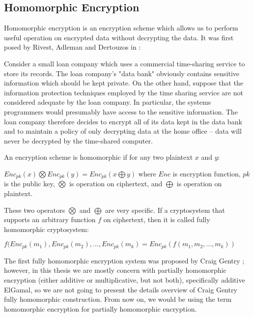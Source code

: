     \subsection{Homomorphic Encryption}
    \label{sec:homomorphic-enc}
	 Homomorphic encryption  is an encryption scheme which allows us to perform useful operation on 
	     encrypted data without decrypting the data.
	     It was first posed by Rivest, Adleman and Dertouzos in \citep{rivest1978data}: 
      
       \begin{displayquote}  
	     Consider a small loan company which uses a commercial time-sharing service to store its records.  
	     The loan company’s "data bank" obviously contains sensitive information which should be kept private.  
	     On the other hand, suppose that the information protection techniques employed by the time sharing 
	     service are not considered adequate by the loan company.  In particular, the systems programmers would 
	     presumably have access to the sensitive information.  The loan company therefore decides to encrypt all 
	     of its data kept in the data bank and to maintain a policy of only decrypting data at the home office -- data 
	     will never be decrypted by the time-shared computer.
	   \end{displayquote}  

 \noindent	     
 An encryption scheme is homomorphic if for any two plaintext $x$ and $y$:
		\begin{displayquote}
		
		 $Enc_{pk}(x) \bigotimes Enc_{pk}(y) = Enc_{pk} (x \bigoplus y)$  where 
		$Enc$ is encryption function, $pk$ is the public key, $\bigotimes$ is operation on ciphertext, and $\bigoplus$
		 is operation on plaintext.
		
		\end{displayquote}
				
		These two operators $\bigotimes$ and $\bigoplus$ are very specific. If a cryptosystem that supports an arbitrary 
		function $f$ on ciphertext, then it is called fully homomorphic cryptosystem:
		\begin{displayquote}
		  $ f (Enc_{pk}(m_{1}), Enc_{pk}(m_{2}), ..., Enc_{pk}(m_{k}) = Enc_{pk}( f (m_{1}, m_{2}, ..., m_{k}))$ 
	    \end{displayquote}
		
		\noindent
		The first fully homomorphic encryption system was proposed by Craig Gentry \citep{Gentry:2009:FHE:1834954}; however, 
		in this thesis we are mostly concern with partially homomorphic encryption (either additive or multiplicative, but not both),
		specifically additive ElGamal, 
		so we are not going to present the details overview 
		of Craig Gentry fully homomorphic construction. From now on, we would be using the term homomorphic encryption for 
		partially homomorphic encryption. 
		 	    
